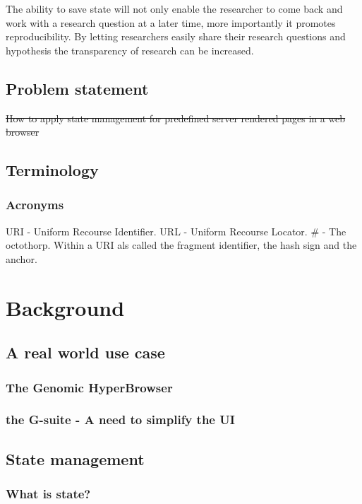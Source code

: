 \documentclass[english]{ifimaster}
\begin{document}
The ability to save state will not only enable the researcher to come back and work with a research question at a later time, more importantly it promotes reproducibility. By letting researchers easily share their research questions and hypothesis the transparency of research can be increased. 


\section{Problem statement}
\sout{How to apply state management for predefined server rendered pages in a web browser}

\section{Terminology}

\subsection{Acronyms}
URI - Uniform Recourse Identifier.
URL - Uniform Recourse Locator. 
\#  - The octothorp. Within a URI als called the fragment identifier, the hash sign and the anchor. 



\chapter{Background}
\section{A real world use case}
\subsection{The Genomic HyperBrowser}
\subsection{the G-suite - A need to simplify the UI}

\section{State management}
\subsection{What is state?}
\label{sec:state}
\end{document}
